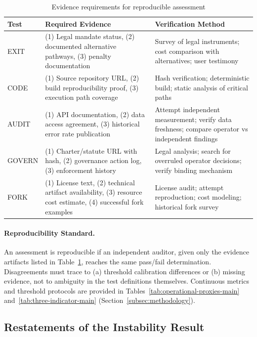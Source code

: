 \documentclass{article}
\begin{document}
\begin{table}[htbp]
\centering
\small
\caption{Evidence requirements for reproducible assessment}
\label{tab:evidence-requirements}
\begin{tabular}{@{}lp{5cm}p{5cm}@{}}
\toprule
\textbf{Test} & \textbf{Required Evidence} & \textbf{Verification Method} \\
\midrule
EXIT & (1) Legal mandate status, (2) documented alternative pathways, (3) penalty documentation & Survey of legal instruments; cost comparison with alternatives; user testimony \\
CODE & (1) Source repository URL, (2) build reproducibility proof, (3) execution path coverage & Hash verification; deterministic build; static analysis of critical paths \\
AUDIT & (1) API documentation, (2) data access agreement, (3) historical error rate publication & Attempt independent measurement; verify data freshness; compare operator vs independent findings \\
GOVERN & (1) Charter/statute URL with hash, (2) governance action log, (3) enforcement history & Legal analysis; search for overruled operator decisions; verify binding mechanism \\
FORK & (1) License text, (2) technical artifact availability, (3) resource cost estimate, (4) successful fork examples & License audit; attempt reproduction; cost modeling; historical fork survey \\
\bottomrule
\end{tabular}
\end{table}

\paragraph{Reproducibility Standard.} An assessment is reproducible if an independent auditor, given only the evidence artifacts listed in Table~\ref{tab:evidence-requirements}, reaches the same pass/fail determination. Disagreements must trace to (a) threshold calibration differences or (b) missing evidence, not to ambiguity in the test definitions themselves. Continuous metrics and threshold protocols are provided in Tables~\ref{tab:operational-proxies-main} and~\ref{tab:three-indicator-main} (Section~\ref{subsec:methodology}).

\subsection{Restatements of the Instability Result}
\end{document}

